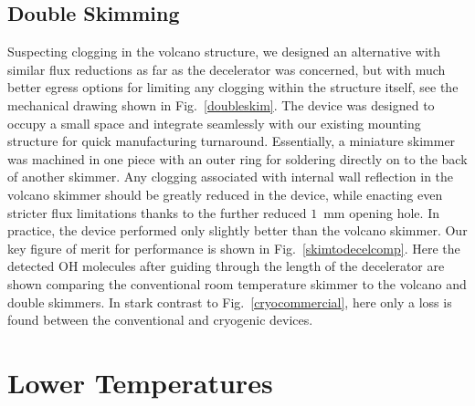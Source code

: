 \subsection{Double Skimming}


Suspecting clogging in the volcano structure, we designed an alternative with similar flux reductions as far as the decelerator was concerned, but with much better egress options for limiting any clogging within the structure itself, see the mechanical drawing shown in Fig.~\ref{doubleskim}.
The device was designed to occupy a small space and integrate seamlessly with our existing mounting structure for quick manufacturing turnaround.
Essentially, a miniature skimmer was machined in one piece with an outer ring for soldering directly on to the back of another skimmer.
Any clogging associated with internal wall reflection in the volcano skimmer should be greatly reduced in the device, while enacting even stricter flux limitations thanks to the further reduced $1$~mm opening hole.
In practice, the device performed only slightly better than the volcano skimmer.
Our key figure of merit for performance is shown in Fig.~\ref{skimtodecelcomp}.
Here the detected OH molecules after guiding through the length of the decelerator are shown comparing the conventional room temperature skimmer to the volcano and double skimmers.
In stark contrast to Fig.~\ref{cryocommercial}, here only a loss is found between the conventional and cryogenic devices.


\section{Lower Temperatures}

